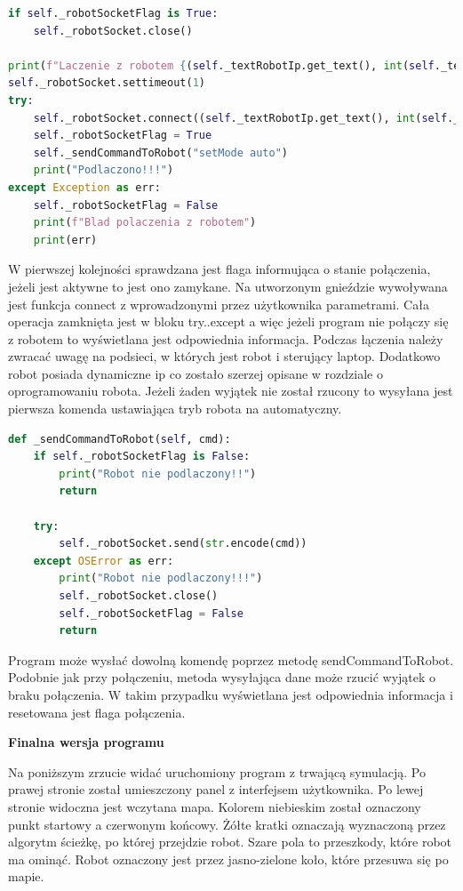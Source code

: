 \begin{lstlisting}[language=Python,caption=Nawiązanie połączenia,label={kodPythonGniazdo}]
if self._robotSocketFlag is True:
    self._robotSocket.close()

print(f"Laczenie z robotem {(self._textRobotIp.get_text(), int(self._textRobotPort.get_text()))}")
self._robotSocket.settimeout(1)
try:
    self._robotSocket.connect((self._textRobotIp.get_text(), int(self._textRobotPort.get_text())))
    self._robotSocketFlag = True
    self._sendCommandToRobot("setMode auto")
    print("Podlaczono!!!")
except Exception as err:
    self._robotSocketFlag = False
    print(f"Blad polaczenia z robotem")
    print(err)
\end{lstlisting}
W pierwszej kolejności sprawdzana jest flaga informująca o stanie połączenia, jeżeli jest aktywne to jest ono zamykane.
Na utworzonym gnieździe wywoływana jest funkcja connect z wprowadzonymi przez użytkownika parametrami.
Cała operacja zamknięta jest w bloku try..except a więc jeżeli program nie połączy się z robotem to wyświetlana jest odpowiednia informacja. 
Podczas łączenia należy zwracać uwagę na podsieci, w których jest robot i sterujący laptop. 
Dodatkowo robot posiada dynamiczne ip co zostało szerzej opisane w rozdziale o oprogramowaniu robota.
Jeżeli żaden wyjątek nie został rzucony to wysyłana jest pierwsza komenda ustawiająca tryb robota na automatyczny.


\begin{lstlisting}[language=Python,caption=Wysyłanie komendy do robota,label={kodPythonSendCmd}]
def _sendCommandToRobot(self, cmd):
    if self._robotSocketFlag is False:
        print("Robot nie podlaczony!!")
        return
    
    try:
        self._robotSocket.send(str.encode(cmd))
    except OSError as err:
        print("Robot nie podlaczony!!!")
        self._robotSocket.close()
        self._robotSocketFlag = False
        return
\end{lstlisting}
Program może wysłać dowolną komendę poprzez metodę sendCommandToRobot. 
Podobnie jak przy połączeniu, metoda wysyłająca dane może rzucić wyjątek o braku połączenia. W takim przypadku
wyświetlana jest odpowiednia informacja i resetowana jest flaga połączenia. 

\textbf{Finalna wersja programu}

Na poniższym zrzucie widać uruchomiony program z trwającą symulacją. Po prawej stronie został umieszczony panel 
z interfejsem użytkownika. Po lewej stronie widoczna jest wczytana mapa. 
Kolorem niebieskim został oznaczony punkt startowy a czerwonym końcowy.
Żółte kratki oznaczają wyznaczoną przez algorytm ścieżkę, po której przejdzie robot. Szare pola to przeszkody, które robot ma ominąć. 
Robot oznaczony jest przez jasno-zielone koło, które przesuwa się po mapie. 

